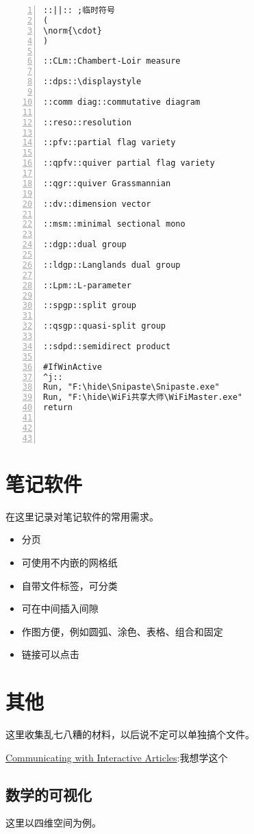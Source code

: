\documentclass[11pt]{amsart}
\begin{document}
\begin{lstlisting}[numbers=left,numberstyle=\tiny,numbersep=10pt]
::||:: ;临时符号
(
\norm{\cdot} 
)

::CLm::Chambert-Loir measure

::dps::\displaystyle

::comm diag::commutative diagram

::reso::resolution

::pfv::partial flag variety

::qpfv::quiver partial flag variety

::qgr::quiver Grassmannian

::dv::dimension vector

::msm::minimal sectional mono

::dgp::dual group

::ldgp::Langlands dual group

::Lpm::L-parameter

::spgp::split group

::qsgp::quasi-split group

::sdpd::semidirect product

#IfWinActive
^j::  
Run, "F:\hide\Snipaste\Snipaste.exe"
Run, "F:\hide\WiFi共享大师\WiFiMaster.exe"
return




\end{lstlisting}
\section{笔记软件}
在这里记录对笔记软件的常用需求。
\begin{itemize}
\item 分页
\item 可使用不内嵌的网格纸
\item 自带文件标签，可分类
\item 可在中间插入间隙
\item 作图方便，例如圆弧、涂色、表格、组合和固定
\item 链接可以点击
\end{itemize}
\section{其他}
这里收集乱七八糟的材料，以后说不定可以单独搞个文件。

\href{https://distill.pub/2020/communicating-with-interactive-articles/}{Communicating with Interactive Articles}:我想学这个
\subsection{数学的可视化}
这里以四维空间为例。
\end{document}
